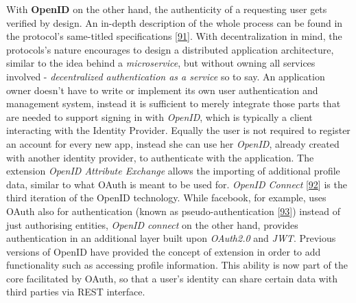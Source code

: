 \documentclass[12pt,english,a4paper,titlepage,cleardoublepage=empty,dottedtoc]{report}
\begin{document}
With \textbf{OpenID} on the other hand, the authenticity of a requesting
user gets verified by design. An in-depth description of the whole
process can be found in the protocol's same-titled specifications
{[}\protect\hyperlink{ref-web_spec_openid-spec-index}{91}{]}. With
decentralization in mind, the protocols's nature encourages to design a
distributed application architecture, similar to the idea behind a
\emph{microservice}, but without owning all services involved -
\emph{decentralized authentication as a service} so to say. An
application owner doesn't have to write or implement its own user
authentication and management system, instead it is sufficient to merely
integrate those parts that are needed to support signing in with
\emph{OpenID}, which is typically a client interacting with the Identity
Provider. Equally the user is not required to register an account for
every new app, instead she can use her \emph{OpenID}, already created
with another identity provider, to authenticate with the application.
The extension \emph{OpenID Attribute Exchange} allows the importing of
additional profile data, similar to what OAuth is meant to be used for.
\emph{OpenID Connect}
{[}\protect\hyperlink{ref-web_spec_openid-connect-1}{92}{]} is the third
iteration of the OpenID technology. While facebook, for example, uses
OAuth also for authentication (known as pseudo-authentication
{[}\protect\hyperlink{ref-web_2017_wikipedia_openid-vs-pseudo-oauth}{93}{]})
instead of just authorising entities, \emph{OpenID connect} on the other
hand, provides authentication in an additional layer built upon
\emph{OAuth2.0} and \emph{JWT}. Previous versions of OpenID have
provided the concept of extension in order to add functionality such as
accessing profile information. This ability is now part of the core
facilitated by OAuth, so that a user's identity can share certain data
with third parties via REST interface.
\end{document}
